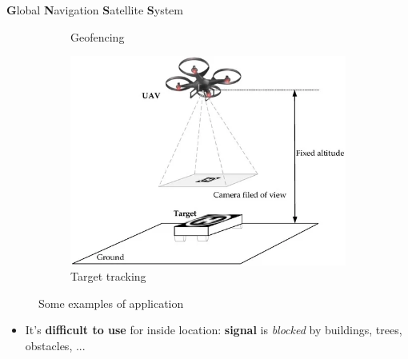 \begin{frame}{\textbf{G}lobal \textbf{N}avigation \textbf{S}atellite \textbf{S}ystem}
\begin{figure}[!htb]
\begin{subfigure}[b]{0.3\textwidth}
            \caption{Geofencing}
            \label{fig:geofencing}
        \end{subfigure}
        \hfill
        \begin{subfigure}[b]{0.3\textwidth}
            \centering
            \includegraphics[width=\linewidth]{images/target.jpg}
            \caption{Target tracking}
            \label{fig:target}
        \end{subfigure}
           \caption{Some examples of application}
           \label{gnss}
    \end{figure}

    \begin{itemize}   
        \item It's \textbf{difficult to use} for inside location: \textbf{signal} is \textit{blocked} by buildings, trees, obstacles, ...
    \end{itemize}
\end{frame}

